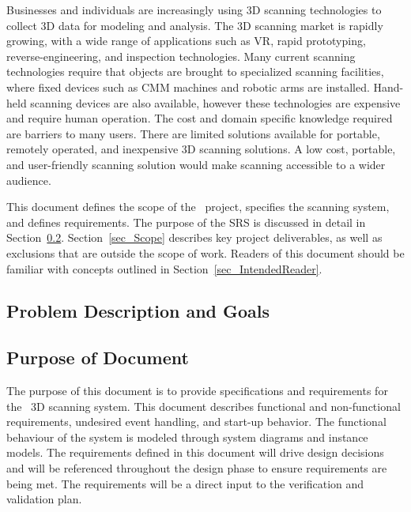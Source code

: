 \documentclass[12pt]{article}
\begin{document}
Businesses and individuals are increasingly using 3D scanning technologies to collect 3D data for modeling and analysis. The 3D scanning market is rapidly growing, with a wide range of applications such as VR, rapid prototyping, reverse-engineering, and inspection technologies. Many current scanning technologies require that objects are brought to specialized scanning facilities, where fixed devices such as CMM machines and robotic arms are installed. Hand-held scanning devices are also available,  however these technologies are expensive and require human operation. The cost and domain specific knowledge required are barriers to many users. There are limited solutions available for portable, remotely operated, and inexpensive 3D scanning solutions.  A low cost, portable, and user-friendly scanning solution would make scanning accessible to a wider audience.
\newline
\par
This document defines the scope of the \progname\ project, specifies the scanning system, and defines requirements. The purpose of the SRS is discussed in detail in Section~\ref{sec_purpose}.  Section~\ref{sec_Scope} describes key project deliverables, as well as exclusions that are outside the scope of work. Readers of this document should be familiar with concepts outlined in Section~\ref{sec_IntendedReader}.

\subsection{Problem Description and Goals}

\subsection{Purpose of Document}
\label{sec_purpose}

  
  The purpose of this document is to provide specifications and requirements for the \progname\ 3D scanning system. This document describes functional and non-functional requirements, undesired event handling, and start-up behavior. The functional behaviour of the system is modeled through system diagrams and instance models. The requirements defined in this document will drive design decisions and will be referenced throughout the design phase to ensure requirements are being met. The requirements will be a direct input to the verification and validation plan.
\end{document}
